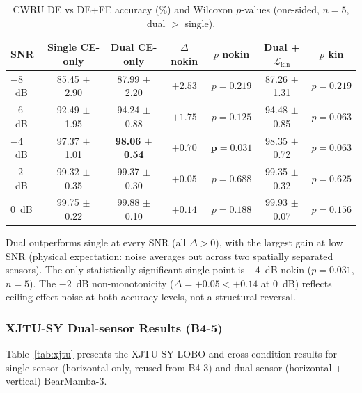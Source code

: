 \begin{table}[htbp]
\centering
\caption{CWRU DE vs DE+FE accuracy (\%) and Wilcoxon $p$-values
         (one-sided, $n=5$, dual $>$ single).}
\label{tab:b2}
\begin{tabular}{lcccccc}
\toprule
SNR &
  Single CE-only &
  Dual CE-only &
  $\Delta$ nokin &
  $p$ nokin &
  Dual +$\mathcal{L}_{\text{kin}}$ &
  $p$ kin \\
\midrule
$-8$~dB & 85.45 $\pm$ 2.90 & 87.99 $\pm$ 2.20 & $+2.53$ & $p=0.219$ & 87.26 $\pm$ 1.31 & $p=0.219$ \\
$-6$~dB & 92.49 $\pm$ 1.95 & 94.24 $\pm$ 0.88 & $+1.75$ & $p=0.125$ & 94.48 $\pm$ 0.85 & $p=0.063$ \\
$-4$~dB & 97.37 $\pm$ 1.01 & \textbf{98.06 $\pm$ 0.54} & $+0.70$ & $\mathbf{p=0.031}$ & 98.35 $\pm$ 0.72 & $p=0.063$ \\
$-2$~dB & 99.32 $\pm$ 0.35 & 99.37 $\pm$ 0.30 & $+0.05$ & $p=0.688$ & 99.35 $\pm$ 0.32 & $p=0.625$ \\
$0$~dB  & 99.75 $\pm$ 0.22 & 99.88 $\pm$ 0.10 & $+0.14$ & $p=0.188$ & 99.93 $\pm$ 0.07 & $p=0.156$ \\
\bottomrule
\end{tabular}
\begin{tablenotes}
\item Dual outperforms single at every SNR (all $\Delta > 0$), with the
      largest gain at low SNR (physical expectation: noise averages out
      across two spatially separated sensors).
      The only statistically significant single-point is $-4$~dB nokin
      ($p = 0.031$, $n = 5$).
      The $-2$~dB non-monotonicity ($\Delta = +0.05 < +0.14$ at $0$~dB)
      reflects ceiling-effect noise at both accuracy levels, not a
      structural reversal.
\end{tablenotes}
\end{table}

\subsubsection{XJTU-SY Dual-sensor Results (B4-5)}
\label{subsubsec:xjtu}

Table~\ref{tab:xjtu} presents the XJTU-SY LOBO and cross-condition results
for single-sensor (horizontal only, reused from B4-3) and dual-sensor
(horizontal + vertical) BearMamba-3.

